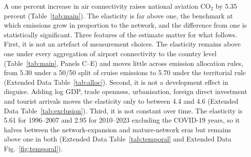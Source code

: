 \documentclass[12pt]{extarticle}
\begin{document}
A one percent increase in air connectivity raises national aviation CO$_2$
by 5.35 percent (Table~\ref{tab:main}). The elasticity is far above one,
the benchmark at which emissions grow in proportion to the network, and
the difference from one is statistically significant. Three features of
the estimate matter for what follows. First, it is not an artefact of
measurement choices. The elasticity remains above one under every
aggregation of airport connectivity to the country level
(Table~\ref{tab:main}, Panels C--E) and moves little across emission
allocation rules, from 5.30 under a 50/50 split of cruise emissions to
5.70 under the territorial rule (Extended Data Table~\ref{tab:alloc}).
Second, it is not a development effect in disguise. Adding log GDP, trade
openness, urbanisation, foreign direct investment and tourist arrivals
moves the elasticity only to between 4.4 and 4.6 (Extended Data Table~\ref{tab:exclusion}). Third, it
is not constant over time. The elasticity is 5.61 for 1996--2007 and 2.95
for 2010--2023 excluding the COVID-19 years, so it halves between the
network-expansion and mature-network eras but remains above one in both
(Extended Data Table~\ref{tab:temporal} and Extended Data
Fig.~\ref{fig:temporal}).
\end{document}

